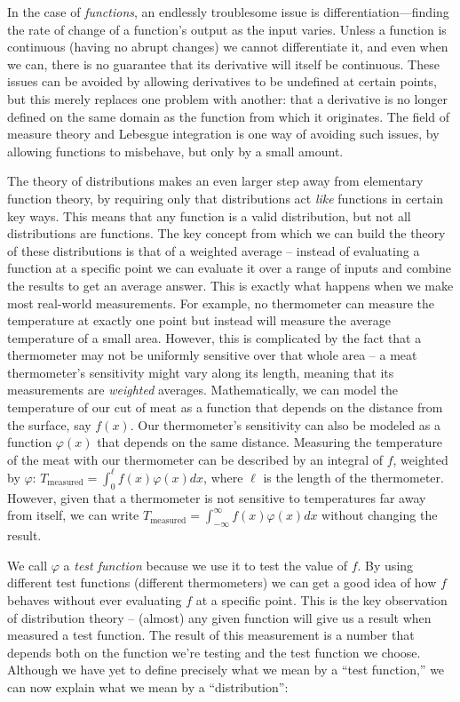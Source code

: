     In the case of \emph{functions}, an endlessly troublesome issue is differentiation---finding the rate of change of a function's output as the input varies.
    Unless a function is continuous (having no abrupt changes) we cannot differentiate it, and even when we can, there is no guarantee that its derivative will itself be continuous.
    These issues can be avoided by allowing derivatives to be undefined at certain points, but this merely replaces one problem with another: that a derivative is no longer defined on the same domain as the function from which it originates.
    The field of measure theory and Lebesgue integration is one way of avoiding such issues, by allowing functions to misbehave, but only by a small amount.

    The theory of distributions makes an even larger step away from elementary function theory, by requiring only that distributions act \emph{like} functions in certain key ways.
    This means that any function is a valid distribution, but not all distributions are functions.
    The key concept from which we can build the theory of these distributions is that of a weighted average -- instead of evaluating a function at a specific point we can evaluate it over a range of inputs and combine the results to get an average answer.
    This is exactly what happens when we make most real-world measurements.
    For example, no thermometer can measure the temperature at exactly one point but instead will measure the average temperature of a small area.
    However, this is complicated by the fact that a thermometer may not be uniformly sensitive over that whole area -- a meat thermometer's sensitivity might vary along its length, meaning that its measurements are \emph{weighted} averages. 
    Mathematically, we can model the temperature of our cut of meat as a function that depends on the distance from the surface, say $f(x)$.
    Our thermometer's sensitivity can also be modeled as a function $\varphi(x)$ that depends on the same distance.
    Measuring the temperature of the meat with our thermometer can be described by an integral of $f$, weighted by $\varphi$: $T_\text{measured} = \int_0^\ell f(x)\varphi(x) dx$, where $\ell$ is the length of the thermometer.
    However, given that a thermometer is not sensitive to temperatures far away from itself, we can write $T_\text{measured} = \int_{-\infty}^{\infty} f(x)\varphi(x)dx$ without changing the result.

    We call $\varphi$ a \emph{test function} because we use it to test the value of $f$.
    By using different test functions (different thermometers) we can get a good idea of how $f$ behaves without ever evaluating $f$ at a specific point.
    This is the key observation of distribution theory -- (almost) any given function will give us a result when measured a test function.
    The result of this measurement is a number that depends both on the function we're testing and the test function we choose.
    Although we have yet to define precisely what we mean by a ``test function,'' we can now explain what we mean by a ``distribution'':

